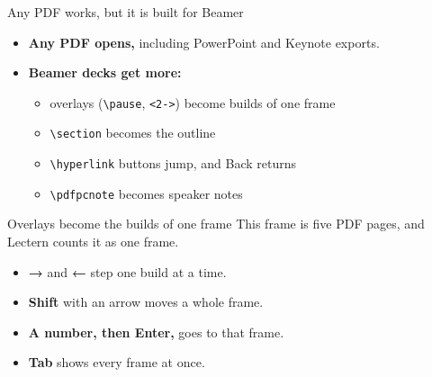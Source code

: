 \documentclass[aspectratio=169,14pt]{beamer}
\newcommand{\key}[1]{\textbf{#1}}
\begin{document}
\begin{frame}{Any PDF works, but it is built for Beamer}
  \begin{itemize}
    \item \textbf{Any PDF opens,} including PowerPoint and Keynote exports.
    \item<2-> \textbf{Beamer decks get more:}
      \begin{itemize}
        \item overlays (\texttt{\textbackslash pause}, \texttt{<2->}) become builds of one frame
        \item \texttt{\textbackslash section} becomes the outline
        \item \texttt{\textbackslash hyperlink} buttons jump, and Back returns
        \item \texttt{\textbackslash pdfpcnote} becomes speaker notes
      \end{itemize}
  \end{itemize}
\end{frame}

\begin{frame}{Overlays become the builds of one frame}
  This frame is five PDF pages, and Lectern counts it as one frame.
  \begin{itemize}
    \item<2-> \key{→} and \key{←} step one build at a time.
    \item<3-> \key{Shift} with an arrow moves a whole frame.
    \item<4-> \key{A number, then Enter,} goes to that frame.
    \item<5-> \key{Tab} shows every frame at once.
  \end{itemize}
\end{frame}
\end{document}

